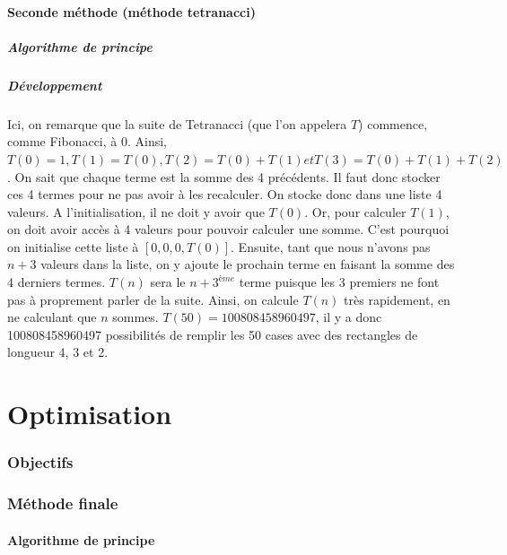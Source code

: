 \documentclass{article}
\begin{document}
\subsection{Seconde méthode (méthode tetranacci)}

\subsubsection{Algorithme de principe}


\subsubsection{Développement}
Ici, on remarque que la suite de Tetranacci (que l'on appelera $T$) commence, comme Fibonacci, à 0. Ainsi, $T(0) = 1, T(1) = T(0), T(2) = T(0) + T(1) et T(3) = T(0) + T(1) + T(2)$. On sait que chaque terme est la somme des 4 précédents. Il faut donc stocker ces 4 termes pour ne pas avoir à les recalculer. On stocke donc dans une liste 4 valeurs. A l'initialisation, il ne doit y avoir que $T(0)$. Or, pour calculer $T(1)$, on doit avoir accès à 4 valeurs pour pouvoir calculer une somme. C'est pourquoi on initialise cette liste à $[0,0,0,T(0)]$. Ensuite, tant que nous n'avons pas $n+3$ valeurs dans la liste, on y ajoute le prochain terme en faisant la somme des 4 derniers termes. $T(n)$ sera le $n+3^{ème}$ terme puisque les 3 premiers ne font pas à proprement parler de la suite. Ainsi, on calcule $T(n)$ très rapidement, en ne calculant que $n$ sommes. $T(50) = 100808458960497$, il y a donc 100808458960497 possibilités de remplir les 50 cases avec des rectangles de longueur 4, 3 et 2.

\newpage
\part {Optimisation}
\section {Objectifs}

\section{Méthode finale}

\subsection{Algorithme de principe}

\end{document}
